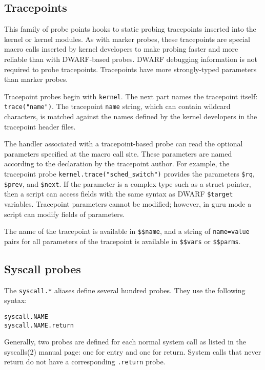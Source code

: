 \documentclass[twoside,english]{article}
\newenvironment{vindent}
{\begin{list}{}{\setlength{\listparindent}{6pt}}
\item[]}
{\end{list}}
\begin{document}
\subsection{Tracepoints}
\label{sec:tracepoints}

This family of probe points hooks to static probing tracepoints
inserted into the kernel or kernel modules.  As with marker probes,
these tracepoints are special macro calls inserted by kernel
developers to make probing faster and more reliable than with
DWARF-based probes.  DWARF debugging information is not required to
probe tracepoints.  Tracepoints have more strongly-typed parameters
than marker probes.

Tracepoint probes begin with \texttt{kernel}.  The next part names the
tracepoint itself: \texttt{trace("name")}.  The tracepoint
\texttt{name} string, which can contain wildcard characters, is
matched against the names defined by the kernel developers in the
tracepoint header files.

The handler associated with a tracepoint-based probe can read the
optional parameters specified at the macro call site.  These
parameters are named according to the declaration by the tracepoint
author.  For example, the tracepoint probe
\texttt{kernel.trace("sched\_switch")} provides the parameters
\texttt{\$rq}, \texttt{\$prev}, and \texttt{\$next}.  If the parameter
is a complex type such as a struct pointer, then a script can access
fields with the same syntax as DWARF \texttt{\$target} variables.
Tracepoint parameters cannot be modified; however, in guru mode a
script can modify fields of parameters.

The name of the tracepoint is available in \texttt{\$\$name}, and a
string of \texttt{name=value} pairs for all parameters of the
tracepoint is available in \texttt{\$\$vars} or \texttt{\$\$parms}.


\subsection{Syscall probes}
\label{sec:syscall}
The \texttt{syscall.*}  aliases define several hundred probes.  They
use the following syntax:
\begin{vindent}
\begin{verbatim}
syscall.NAME
syscall.NAME.return
\end{verbatim}
\end{vindent}

Generally, two probes are defined for each normal system call as
listed in the syscalls(2) manual page: one for entry and one for
return.   System calls that never return do not have a
corresponding \texttt{.return} probe.
\end{document}
